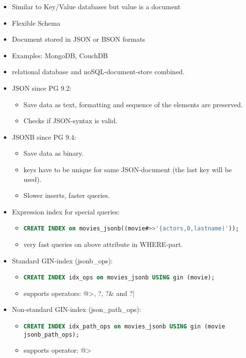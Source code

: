 \begin{breakbox}
\begin{itemize}
	\item Similar to Key/Value databases but value is a document
	\item Flexible Schema
	\item Document stored in JSON or BSON formats
	\item Examples: MongoDB, CouchDB
\end{itemize}
\end{breakbox}

\begin{breakbox}
\begin{itemize}
	\item relational database and noSQL-document-store combined.
	\item JSON since PG 9.2:
		\begin{itemize}
			\item Save data as text, formatting and sequence of the elements are preserved.
			\item Checks if JSON-syntax is valid.
		\end{itemize}
	\item JSONB since PG 9.4:
		\begin{itemize}
			\item Save data as binary.
			\item keys have to be unique for same JSON-document (the last key will be used).
			\item Slower inserts, faster queries.
		\end{itemize}
	\item Expression index for special queries:
		\begin{itemize}
			\item \lstinline[language=SQL]{CREATE INDEX on movies_jsonb((movie#>>'{actors,0,lastname)'));}
			\item very fast queries on above attribute in WHERE-part.
		\end{itemize}
	\item Standard GIN-index (jsonb\_ops):
		\begin{itemize}
			\item \lstinline[language=SQL]{CREATE INDEX idx_ops on movies_jsonb USING gin (movie);}
			\item supports operators: @>, ?, ?\& and ?|
		\end{itemize}
	\item Non-standard GIN-index (json\_path\_ops):
		\begin{itemize}
			\item \lstinline[language=SQL]{CREATE INDEX idx_path_ops on movies_jsonb USING gin (movie jsonb_path_ops);}
			\item supports operator: @>
		\end{itemize}
\end{itemize}
\end{breakbox}

\begin{breakbox}
\end{breakbox}



















